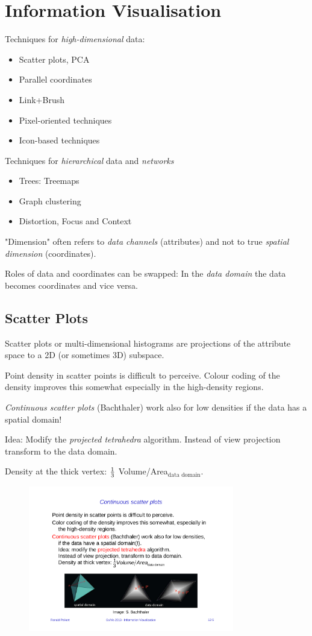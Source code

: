 \section{Information Visualisation}
Techniques for \emph{high-dimensional} data:
\begin{itemize}
\item Scatter plots, PCA
\item Parallel coordinates
\item Link+Brush
\item Pixel-oriented techniques
\item Icon-based techniques
\end{itemize}

Techniques for \emph{hierarchical} data and \emph{networks}
\begin{itemize}
\item Trees: Treemaps
\item Graph clustering
\item Distortion, Focus and Context
\end{itemize}

"Dimension" often refers to \emph{data channels} (attributes) and not to true \emph{spatial dimension} (coordinates).

Roles of data and coordinates can be swapped: In the \emph{data domain} the data becomes coordinates and vice versa.

\subsection{Scatter Plots}
Scatter plots or multi-dimensional histograms are projections of the attribute space to a 2D (or sometimes 3D) subspace.

Point density in scatter points is difficult to perceive. Colour coding of the density improves this somewhat especially in the high-density regions.

\emph{Continuous scatter plots} (Bachthaler) work also for low densities if the data has a spatial domain!

Idea: Modify the \emph{projected tetrahedra} algorithm. Instead of view projection transform to the data domain. 

Density at the thick vertex: ${1\over 3}$ Volume/Area$_\text{data domain}$.
\begin{figure}[H]
\centering
\includegraphics[width=0.8\textwidth]{img/12_continuous_scatter_plots}
\end{figure}

